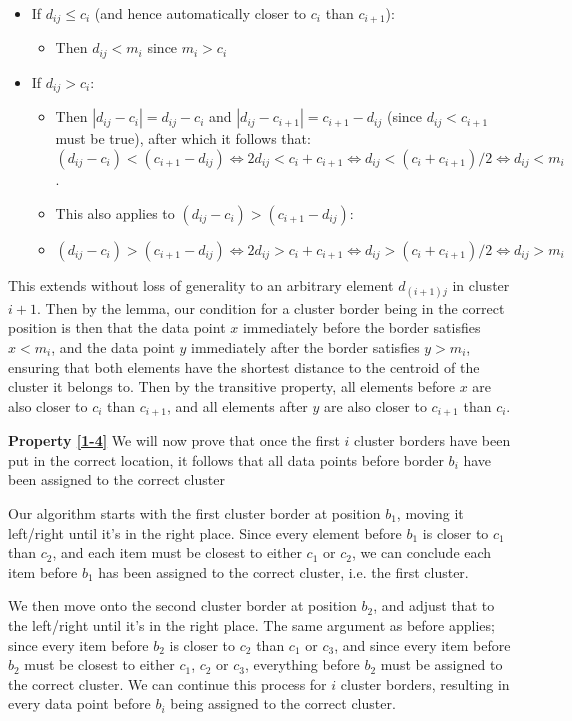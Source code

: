 \documentclass[conference,compsoc]{IEEEtran}
\begin{document}
\begin{itemize}
    \item If $d_{ij} \leq c_i$ (and hence automatically closer to $c_i$ than $c_{i+1}$):
    \begin{itemize}
        \item Then $d_{ij} < m_i$ since $m_i > c_i$
    \end{itemize}
    \item If $d_{ij} > c_i:$
    \begin{itemize}
        \item Then $|d_{ij} - c_i| = d_{ij} - c_i$ and $|d_{ij}-c_{i+1}| = c_{i+1}-d_{ij}$ (since $d_{ij} < c_{i+1}$ must be true), after which it follows that: $(d_{ij}-c_i) < (c_{i+1}-d_{ij}) \iff 2d_{ij} < c_i+c_{i+1} \iff d_{ij} < (c_i+c_{i+1})/2 \iff d_{ij} < m_i$.
        \item This also applies to $(d_{ij}-c_i) > (c_{i+1}-d_{ij})$: 
        \item $(d_{ij}-c_i) > (c_{i+1}-d_{ij}) \iff 2d_{ij} > c_i+c_{i+1} \iff d_{ij} > (c_i+c_{i+1})/2 \iff d_{ij} > m_i$
    \end{itemize}
\end{itemize}

This extends without loss of generality to an arbitrary element $d_{(i+1)j}$ in cluster $i+1$.
Then by the lemma, our condition for a cluster border being in the correct position is then that
the data point $x$ immediately before the border satisfies $x < m_i$, and the data point $y$ immediately after the border satisfies $y > m_i$,
ensuring that both elements have the shortest distance to the centroid of the cluster it belongs to.
Then by the transitive property, all elements before $x$ are also closer to $c_i$ than $c_{i+1}$, and all elements after $y$ are also closer to $c_{i+1}$ than $c_i$.

\textbf{Property \ref{1-4}}
We will now prove that once the first $i$ cluster borders have been put in the correct location, it follows that all data points before border $b_i$ have been assigned to the correct cluster

Our algorithm starts with the first cluster border at position $b_1$, moving it left/right until it’s in the right place.
Since every element before $b_1$ is closer to $c_1$ than $c_2$, and each item must be closest to either $c_1$ or $c_2$,
we can conclude each item before $b_1$ has been assigned to the correct cluster, i.e. the first cluster.

We then move onto the second cluster border at position $b_2$, and adjust that to the left/right until it’s in the right place.
The same argument as before applies; since every item before $b_2$ is closer to $c_2$ than $c_1$ or $c_3$,
and since every item before $b_2$ must be closest to either $c_1$, $c_2$ or $c_3$, everything before $b_2$ must be assigned to the correct cluster.
We can continue this process for $i$ cluster borders, resulting in every data point before $b_i$ being assigned to the correct cluster.
\end{document}
